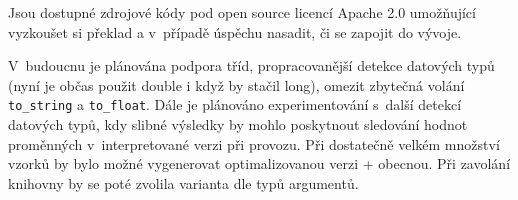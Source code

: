\documentclass[czech]{ExcelAtFIT}
\newcommand{\function}[1]{\texttt{#1}}
\begin{document}



	Jsou dostupné zdrojové kódy pod open source licencí Apache 2.0 umožňující vyzkoušet si překlad a v~případě úspěchu nasadit, či se zapojit do vývoje.

	V~budoucnu je plánována podpora tříd, propracovanější detekce datových typů (nyní je občas použit double i když by stačil long), omezit zbytečná volání \function{to\_string} a \function{to\_float}. Dále je plánováno ex\-pe\-ri\-men\-to\-vá\-ní s~další detekcí datových typů, kdy slibné výsledky by mohlo poskytnout sledování hodnot pro\-měn\-ných v~interpretované verzi při provozu. Při dos\-ta\-teč\-ně velkém množství vzorků by bylo možné vygenerovat optimalizovanou verzi + obecnou. Při zavolání knihovny by se poté zvolila varianta dle typů argumentů.





\end{document}
